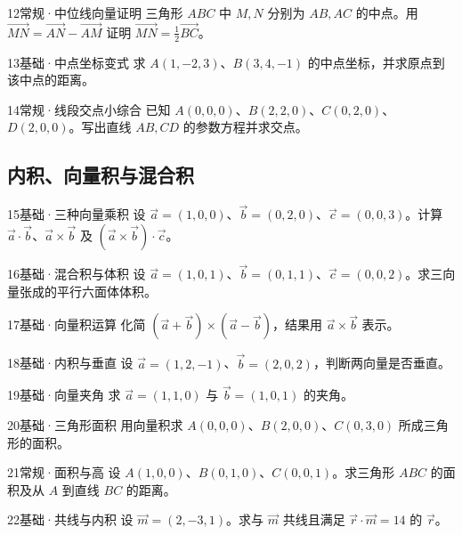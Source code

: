 \begin{exercise}{12}{常规·中位线向量证明}
三角形 $ABC$ 中 $M,N$ 分别为 $AB,AC$ 的中点。用 $\overrightarrow{MN}=\overrightarrow{AN}-\overrightarrow{AM}$ 证明 $\overrightarrow{MN}=\frac12\overrightarrow{BC}$。
\end{exercise}
\begin{exercise}{13}{基础·中点坐标变式}
求 $A(1,-2,3)$、$B(3,4,-1)$ 的中点坐标，并求原点到该中点的距离。
\end{exercise}
\begin{exercise}{14}{常规·线段交点小综合}
已知 $A(0,0,0)$、$B(2,2,0)$、$C(0,2,0)$、$D(2,0,0)$。写出直线 $AB,CD$ 的参数方程并求交点。
\end{exercise}
\subsection{内积、向量积与混合积}
\begin{exercise}{15}{基础·三种向量乘积}
设 $\vec a=(1,0,0)$、$\vec b=(0,2,0)$、$\vec c=(0,0,3)$。计算 $\vec a\cdot\vec b$、$\vec a\times\vec b$ 及 $(\vec a\times\vec b)\cdot\vec c$。
\end{exercise}
\begin{exercise}{16}{基础·混合积与体积}
设 $\vec a=(1,0,1)$、$\vec b=(0,1,1)$、$\vec c=(0,0,2)$。求三向量张成的平行六面体体积。
\end{exercise}
\begin{exercise}{17}{基础·向量积运算}
化简 $(\vec a+\vec b)\times(\vec a-\vec b)$，结果用 $\vec a\times\vec b$ 表示。
\end{exercise}
\begin{exercise}{18}{基础·内积与垂直}
设 $\vec a=(1,2,-1)$、$\vec b=(2,0,2)$，判断两向量是否垂直。
\end{exercise}
\begin{exercise}{19}{基础·向量夹角}
求 $\vec a=(1,1,0)$ 与 $\vec b=(1,0,1)$ 的夹角。
\end{exercise}
\begin{exercise}{20}{基础·三角形面积}
用向量积求 $A(0,0,0)$、$B(2,0,0)$、$C(0,3,0)$ 所成三角形的面积。
\end{exercise}
\begin{exercise}{21}{常规·面积与高}
设 $A(1,0,0)$、$B(0,1,0)$、$C(0,0,1)$。求三角形 $ABC$ 的面积及从 $A$ 到直线 $BC$ 的距离。
\end{exercise}
\begin{exercise}{22}{基础·共线与内积}
设 $\vec m=(2,-3,1)$。求与 $\vec m$ 共线且满足 $\vec r\cdot\vec m=14$ 的 $\vec r$。
\end{exercise}
